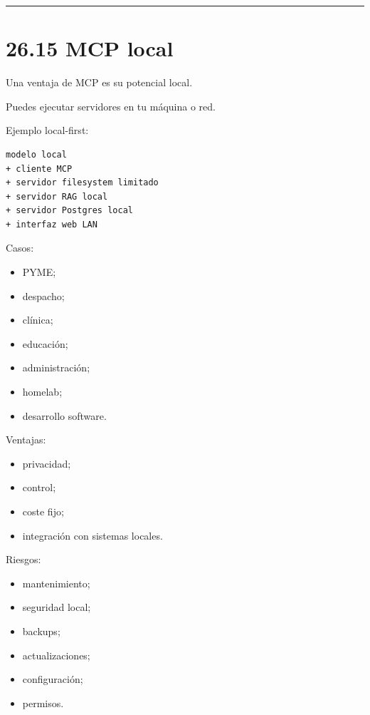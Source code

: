 \begin{center}\rule{0.5\linewidth}{0.5pt}\end{center}

\section{26.15 MCP local}\label{mcp-local}

Una ventaja de MCP es su potencial local.

Puedes ejecutar servidores en tu máquina o red.

Ejemplo local-first:

\begin{lstlisting}
modelo local
+ cliente MCP
+ servidor filesystem limitado
+ servidor RAG local
+ servidor Postgres local
+ interfaz web LAN
\end{lstlisting}

Casos:

\begin{itemize}
\tightlist
\item
  PYME;
\item
  despacho;
\item
  clínica;
\item
  educación;
\item
  administración;
\item
  homelab;
\item
  desarrollo software.
\end{itemize}

Ventajas:

\begin{itemize}
\tightlist
\item
  privacidad;
\item
  control;
\item
  coste fijo;
\item
  integración con sistemas locales.
\end{itemize}

Riesgos:

\begin{itemize}
\tightlist
\item
  mantenimiento;
\item
  seguridad local;
\item
  backups;
\item
  actualizaciones;
\item
  configuración;
\item
  permisos.
\end{itemize}

